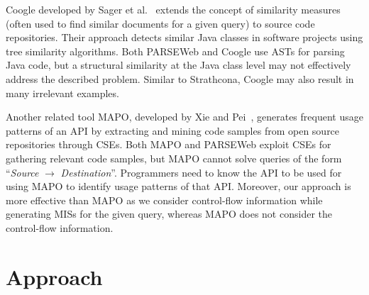 \documentclass{fp035-thummalapenta}
\begin{document}
Coogle developed by Sager et al.~\cite{sager-msr06-clsim} extends
the concept of similarity measures (often used to find similar
documents for a given query) to source code repositories. Their
approach detects similar Java classes in software projects using
tree similarity algorithms. Both PARSEWeb and Coogle use ASTs for
parsing Java code, but a structural similarity at the Java class
level may not effectively address the described problem. Similar to
Strathcona, Coogle may also result in many irrelevant examples.

Another related tool MAPO, developed by Xie and Pei~\cite{mapo:xie},
generates frequent usage patterns of an API by extracting and mining
code samples from open source repositories through CSEs. Both MAPO and PARSEWeb exploit CSEs for
gathering relevant code samples, but MAPO cannot solve queries of
the form ``\emph{Source} $\rightarrow$ \emph{Destination}''.
Programmers need to know the API to be used for using MAPO to
identify usage patterns of that API. Moreover, our approach is more
effective than MAPO as we consider control-flow information while
generating MISs for the given query, whereas MAPO does not consider
the control-flow information.

\section{Approach}
\label{sec:summary}
\end{document}
